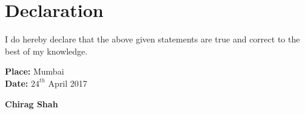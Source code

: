 \documentclass{article}
\newcommand\tab[1][1cm]{\hspace*{#1}}
\begin{document}
	\section*{Declaration}
	\tab I do hereby declare that the above given statements are true and correct to the best of my knowledge.\\
	
	\vspace{2cm} 
	\noindent \parbox[t]{0.7\linewidth}
	{
		\textbf{Place:} Mumbai\\
		\textbf{Date:} $24^{th}$ April 2017	
	}	 
	\vspace{0.15cm}
	\parbox[t]{0.45\linewidth}
	{
		\vspace{0.15cm}
		\textbf{Chirag Shah}
	}
	
\end{document}
